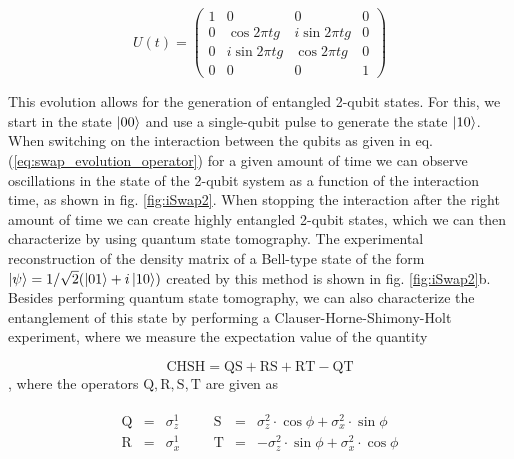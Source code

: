 \begin{equation}
	U(t)  =  \left( \begin{array}{cccc} 1 & 0 & 0 & 0 \\ 0 & \cos{2 \pi t g} & i\sin{2 \pi t g} & 0 \\ 0 & i\sin{2 \pi t g} & \cos{2 \pi t g} & 0 \\ 0 & 0 & 0 & 1 \end{array} \right) \label{eq:swap_evolution_operator}
\end{equation}

This evolution allows for the generation of entangled 2-qubit states. For this, we start in the state $\left| 00 \right>$ and use a single-qubit pulse to generate the state $\left| 10 \right>$. When switching on the interaction between the qubits as given in eq. (\ref{eq:swap_evolution_operator}) for a given amount of time we can observe oscillations in the state of the 2-qubit system as a function of the interaction time, as shown in fig. \ref{fig:iSwap2}. When stopping the interaction after the right amount of time we can create highly entangled 2-qubit states, which we can then characterize by using quantum state tomography. The experimental reconstruction of the density matrix of a Bell-type state of the form $\left| \psi \right> = 1/\sqrt{2}(\left| 01 \right>+i\left| 10 \right>)$ created by this method is shown in fig. \ref{fig:iSwap2}b. Besides performing quantum state tomography, we can also characterize the entanglement of this state by performing a Clauser-Horne-Shimony-Holt experiment\citep{clauser_proposed_1969}, where we measure the expectation value of the quantity

\begin{equation}
\mathrm{CHSH} = \mathrm{QS}+\mathrm{RS}+\mathrm{RT}-\mathrm{QT}
\end{equation}
, where the operators $\mathrm{Q,R,S,T}$ are given as

\begin{eqnarray}
	\begin{array}{cccccccc}
		\mathrm{Q} & = & \sigma_z^1 &&& \mathrm{S} & = & \sigma_z^2\cdot \cos{\phi}+\sigma_x^2 \cdot \sin{\phi} \\
		\mathrm{R} & = & \sigma_x^1 &&& \mathrm{T} & = & -\sigma_z^2\cdot \sin{\phi}+\sigma_x^2 \cdot \cos{\phi}
	\end{array}
\end{eqnarray} 

